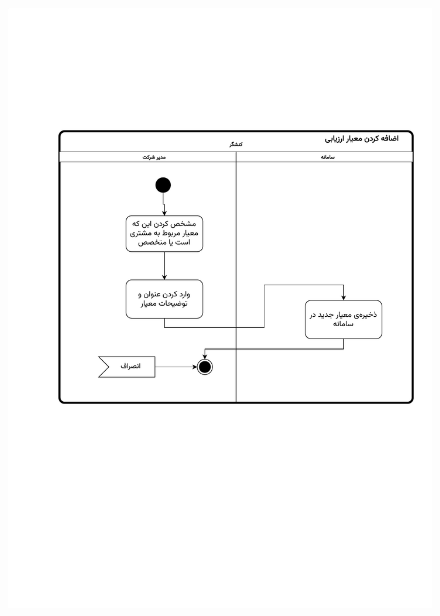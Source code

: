 \begin{figure}[ht!]
	\centering
	\includegraphics[scale=0.8, page=1]{figs/OOD-activity-addeval.pdf}
\end{figure}
\FloatBarrier
\newpage

